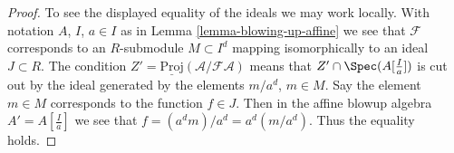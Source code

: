 \begin{proof}
\medskip\noindent
To see the displayed equality of the ideals we may work locally.
With notation $A$, $I$, $a \in I$ as in Lemma \ref{lemma-blowing-up-affine}
we see that $\mathcal{F}$ corresponds to an $R$-submodule $M \subset I^d$
mapping isomorphically to an ideal $J \subset R$. The condition
$Z' = \underline{\text{Proj}}(\mathcal{A}/\mathcal{F}\mathcal{A})$
means that $Z' \cap \Spec(A[\frac{I}{a}])$ is cut out by the ideal
generated by the elements $m/a^d$, $m \in M$. Say the element $m \in M$
corresponds to the function $f \in J$. Then in the affine blowup algebra
$A' = A[\frac{I}{a}]$ we see that $f = (a^dm)/a^d = a^d (m/a^d)$.
Thus the equality holds.
\end{proof}






